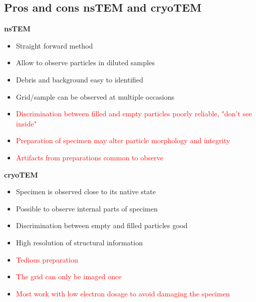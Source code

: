 	\subsection{Pros and cons nsTEM and cryoTEM}
	\textbf{nsTEM}
	\begin{itemize}
		\item \textcolor{OliveGreen}{Straight forward method}
		\item \textcolor{OliveGreen}{Allow to observe particles in diluted samples} 
		\item \textcolor{OliveGreen}{Debris and background easy to identified}
		\item \textcolor{OliveGreen}{Grid/sample can be observed at multiple occasions}
		\item \textcolor{red}{Discrimination between filled and empty particles poorly reliable, "don't see inside"}
		\item \textcolor{red}{Preparation of specimen may alter particle morphology and integrity}
		\item \textcolor{red}{Artifacts from preparations common to observe}  
	\end{itemize}

	\textbf{cryoTEM}
	\begin{itemize}
		\item \textcolor{OliveGreen}{Specimen is observed close to its native state}
		\item \textcolor{OliveGreen}{Possible to observe internal parts of specimen}
		\item \textcolor{OliveGreen}{Discrimination between empty and filled particles good}
		\item \textcolor{OliveGreen}{High resolution of structural information}
		\item \textcolor{red}{Tedious preparation}
		\item \textcolor{red}{The grid can only be imaged once}
		\item \textcolor{red}{Most work with low electron dosage to avoid damaging the specimen}       
	\end{itemize}
	  
	
























	    


	      
